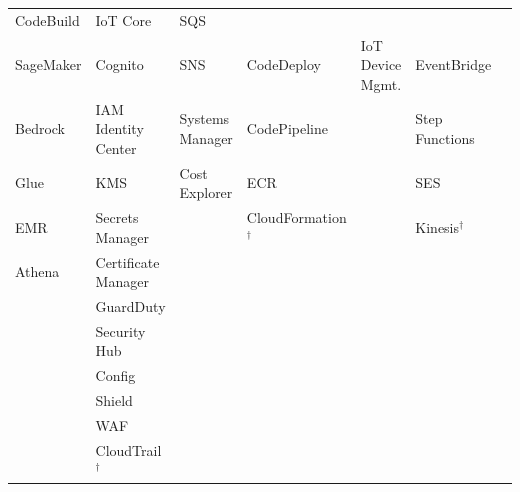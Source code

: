 \begin{table}[htbp]
{\begin{tabularx}{1.6\linewidth}{XXXXXXX}
CodeBuild                   & IoT Core                   & SQS                      & \\
SageMaker                   & Cognito                    & SNS                      &
CodeDeploy                  & IoT Device Mgmt.           & EventBridge              & \\
Bedrock                     & IAM Identity Center        & Systems Manager          &
CodePipeline                &                            & Step Functions           & \\
Glue                        & KMS                        & Cost Explorer            &
ECR                         &                            & SES                      & \\
EMR                         & Secrets Manager            &                          &
CloudFormation$^{\dagger}$  &                            & Kinesis$^{\dagger}$      & \\
Athena                      & Certificate Manager        &                          &
                            &                            &                          & \\
                            & GuardDuty                  &                          &
                            &                            &                          & \\
                            & Security Hub               &                          &
                            &                            &                          & \\
                            & Config                     &                          &
                            &                            &                          & \\
                            & Shield                     &                          &
                            &                            &                          & \\
                            & WAF                        &                          &
                            &                            &                          & \\
                            & CloudTrail$^{\dagger}$     &                          &
                            &                            &                          & \\
\bottomrule
\end{tabularx}
}%
\end{table}

